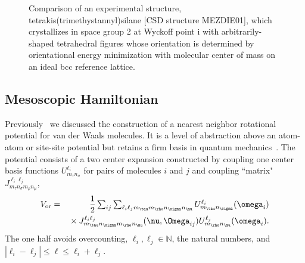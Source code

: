 \documentclass[preprint]{iucr}              %
\newcommand{\mb}[1]{\ensuremath{\mbox{\boldmath $ #1 $}}}
\begin{document}

\begin{figure}
\caption{Comparison of an experimental structure,
tetrakis(trimethystannyl)silane  [CSD structure MEZDIE01], which
crystallizes in space group 2 at Wyckoff point i with
arbitrarily-shaped tetrahedral figures whose orientation is
determined by orientational energy minimization with molecular
center of mass on an ideal bcc reference lattice.\label{compare}}
\end{figure}

\subsection{Mesoscopic Hamiltonian}
\label{hamiltonian}

Previously~\cite{Mettes04} we discussed the construction of a
nearest neighbor rotational potential for van der Waals molecules.
It is a level of abstraction above an atom-atom or site-site
potential but retains a firm basis in quantum
mechanics~\cite{Avoird94}. The potential consists of a two center
expansion constructed by coupling one center basis functions
$U^{\ell_i}_{m_\tau n_\sigma}$ for pairs of molecules $i$ and $j$
and coupling ``matrix" $J_{m_\tau n_\sigma m_\rho n_\mu}^{\ell_i
\ell_j}$,
\begin{eqnarray}
\label{re:eq:vij2}V_{\mathrm{or}} &=&
\frac{1}{2}\sum_{ij}\sum_{\ell_i\ell_j m_\tau m_\rho n_\sigma n_\mu}
U^{\ell_i}_{m_\tau n_\sigma}(\mb{\omega}_i)\nonumber\\
&&{}\times J_{m_\tau n_\sigma m_\rho n_\mu}^{\ell_i
\ell_j}(\mb{\nu},\mb{\Omega}_{ij})U^{\ell_j}_{m_\rho
n_\mu}(\mb{\omega}_i).
\end{eqnarray}
The one half avoids overcounting, $\ell_i,\ell_j\in\mathbb{N}$, the
natural numbers, and $|\ell_i-\ell_j|\leq\ell\leq \ell_i+\ell_j$.
\end{document}
